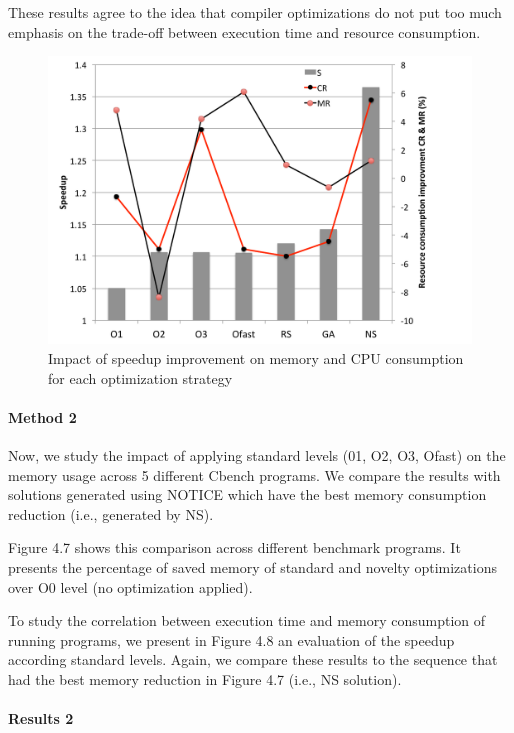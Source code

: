These results agree to the idea that compiler optimizations do not put too much emphasis on the trade-off between execution time and resource consumption.


\begin{figure}[h]
		\centering
		\includegraphics[width=0.9\linewidth]{chapitre3/fig/rq3.pdf}
		\caption{Impact of speedup improvement on memory and CPU consumption for each optimization strategy}
\end{figure}


\paragraph{Method 2}

Now, we study the impact of applying standard levels (01, O2, O3, Ofast) on the memory usage across 5 different Cbench programs. We compare the results with solutions generated using NOTICE which have the best memory consumption reduction (i.e., generated by NS). 

Figure 4.7 shows this comparison across different benchmark programs. It presents the percentage of saved memory of standard and novelty optimizations over O0 level (no optimization applied).

To study the correlation between execution time and memory consumption of running programs, we present in Figure 4.8 an evaluation of the speedup according standard levels. Again, we compare these results to the sequence that had the best memory reduction in Figure 4.7 (i.e., NS solution). 

\paragraph{Results 2}

